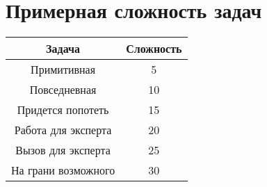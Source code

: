 \section{Примерная сложность задач}
\begin{center}
\begin{tabular}{ |c|c| }
\hline
 \textbf{Задача} & \textbf{Сложность} \\ 
\hline
 Примитивная & 5 \\
\hline
 Повседневная & 10 \\
\hline
 Придется попотеть & 15 \\
\hline
 Работа для эксперта & 20 \\
\hline
 Вызов для эксперта & 25 \\
\hline
 На грани возможного & 30 \\
\hline
\end{tabular}
\end{center}


